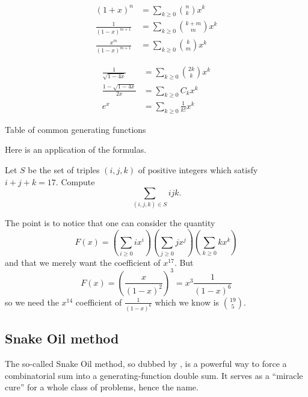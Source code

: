 \documentclass[11pt]{scrartcl}
\begin{document}
\begin{table}[ht]
	\centering
	\begin{minipage}{0.4\textwidth}
	\begin{mdframed}
	\begin{align*}
		(1+x)^n &= \sum_{k \ge 0} \binom{n}{k} x^k \\
		\frac{1}{(1-x)^{m+1}}
			&= \sum_{k \ge 0} \binom{k+m}{m} x^k \\
		\frac{x^m}{(1-x)^{m+1}} 
			&= \sum_{k \ge 0} \binom{k}{m} x^k
	\end{align*}
	\end{mdframed}
	\end{minipage}
	\qquad
	\begin{minipage}{0.4\textwidth}
	\begin{mdframed}
	\begin{align*}
		\frac{1}{\sqrt{1-4x}} &= \sum_{k \ge 0} \binom{2k}{k} x^k \\
		\frac{1-\sqrt{1-4x}}{2x} &= \sum_{k \ge 0} C_k x^k \\
		e^x &= \sum_{k \ge 0} \frac{1}{k!} x^k
	\end{align*}
	\end{mdframed}
	\end{minipage}
	\caption{Table of common generating functions}
	\label{tab:genfunc}
\end{table}

Here is an application of the formulas.
\begin{example}
	Let $S$ be the set of triples $(i,j,k)$ of positive integers
	which satisfy $i+j+k=17$. Compute
	\[ \sum_{(i,j,k) \in S} ijk. \]
\end{example}
\begin{soln}
	The point is to notice that one can consider the quantity
	\[
		F(x)
		=
		\left( \sum_{i \ge 0} i x^i \right)
		\left( \sum_{j \ge 0} j x^j \right)
		\left( \sum_{k \ge 0} k x^k \right)
	\]
	and that we merely want the coefficient of $x^{17}$.
	But
	\[
		F(x) = \left( \frac{x}{(1-x)^2} \right)^3
		= x^3 \frac{1}{(1-x)^6}
	\]
	so we need the $x^{14}$ coefficient of $\frac{1}{(1-x)^6}$
	which we know is $\binom{19}{5}$.
\end{soln}



\subsection{Snake Oil method}
The so-called Snake Oil method, so dubbed by \cite{ref:gfo},
is a powerful way to force a combinatorial sum into a
generating-function double sum.
It serves as a ``miracle cure'' for a whole class of problems, hence the name.
\end{document}
